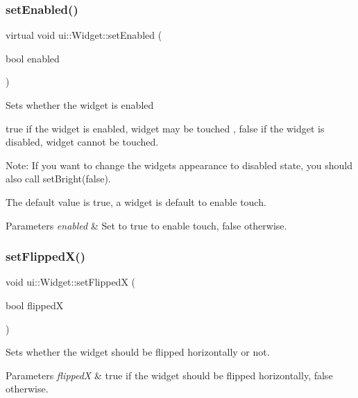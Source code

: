 \subsubsection{\texorpdfstring{set\+Enabled()}{setEnabled()}\hspace{0.1cm}{\footnotesize\ttfamily [2/2]}}
{\footnotesize\ttfamily virtual void ui\+::\+Widget\+::set\+Enabled (\begin{DoxyParamCaption}\item[{bool}]{enabled }\end{DoxyParamCaption})\hspace{0.3cm}{\ttfamily [virtual]}}

Sets whether the widget is enabled

true if the widget is enabled, widget may be touched , false if the widget is disabled, widget cannot be touched.

Note\+: If you want to change the widget\textquotesingle{}s appearance to disabled state, you should also call {\ttfamily set\+Bright(false)}.

The default value is true, a widget is default to enable touch.


\begin{DoxyParams}{Parameters}
{\em enabled} & Set to true to enable touch, false otherwise. \\
\hline
\end{DoxyParams}
\mbox{\label{classui_1_1Widget_adeffb95b64ba85db92cc533457883194}} 
\subsubsection{\texorpdfstring{set\+Flipped\+X()}{setFlippedX()}\hspace{0.1cm}{\footnotesize\ttfamily [1/2]}}
{\footnotesize\ttfamily void ui\+::\+Widget\+::set\+FlippedX (\begin{DoxyParamCaption}\item[{bool}]{flippedX }\end{DoxyParamCaption})\hspace{0.3cm}{\ttfamily [virtual]}}

Sets whether the widget should be flipped horizontally or not.


\begin{DoxyParams}{Parameters}
{\em flippedX} & true if the widget should be flipped horizontally, false otherwise. \\
\hline
\end{DoxyParams}
\mbox{\label{classui_1_1Widget_a0d01847eabfc17cf518c335d622ac23b}} 
